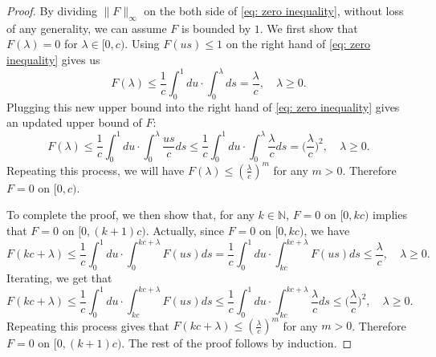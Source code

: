 \documentclass[12pt,a4paper]{amsart}
\numberwithin{equation}{section}
\begin{document}
\begin{proof}
	By dividing $\|F\|_\infty$ on the both side of \ref{eq: zero inequality}, without loss of any generality, we can assume $F$ is bounded by $1$.
	We first show that $F(\lambda)=0$ for $\lambda \in [0,c)$.
	Using  $F(us)\leq 1$ on the right hand of \eqref{eq: zero inequality} gives us
	\begin{equation*}
		F(\lambda)
		\leq
		\frac{1}{c}\int_0^1du
		\cdot
		\int_0^\lambda ds
		=
		\frac{\lambda}{c},
		\quad
		\lambda\geq 0.
	\end{equation*}
	Plugging this new upper bound into the right hand of \eqref{eq: zero inequality} gives an updated upper bound of $F$:
	\begin{equation*}
		F(\lambda)
		\leq \frac{1}{c}\int_0^1du \cdot \int_0^\lambda \frac{us}{c}ds \leq \frac{1}{c}\int_0^1du \cdot \int_0^\lambda \frac{\lambda}{c}ds
		= \Big(\frac{\lambda}{c}\Big)^2,
		\quad
		\lambda\geq 0.
	\end{equation*}
	Repeating this process, we will have $F(\lambda)\leq (\frac{\lambda}{c})^m$ for any $m>0$. Therefore $F=0$ on $[0,c)$.
	
	To complete the proof, we then show that, for any $k\in\mathbb N$, $F=0$ on $[0,kc)$ implies that $F=0$ on $[0,(k+1)c)$.
	Actually, since $F=0$ on $[0,kc)$, we have
	\begin{equation*}
		F ( k c + \lambda )
		\leq
		\frac { 1 } { c } \int_0^1 du \cdot \int_0^{ k c + \lambda } F ( u s ) ds
		=
		\frac{1}{c}\int_0^1du\cdot\int_{kc}^{kc+\lambda}
		F(us)ds\leq\frac{\lambda}{c}, \quad \lambda\geq 0.
	\end{equation*}
	Iterating, we get that
	\begin{equation*}
		F(kc+\lambda)
		\leq
		\frac{1}{c}\int_0^1du\cdot\int_{kc}^{kc+\lambda} F(us)ds
		\leq
		\frac{1}{c}\int_0^1du\cdot\int_{kc}^{kc+\lambda} \frac{\lambda}{c}ds
		\leq
		\Big(\frac{\lambda}{c}\Big)^2, \quad \lambda\geq 0.
	\end{equation*}
	Repeating this process gives that $F(kc+\lambda)\leq (\frac{\lambda}{c})^m$ for any $m>0$. Therefore $F=0$ on $[0,(k+1)c)$. The rest of the proof follows by induction.
\end{proof}
\end{document}
